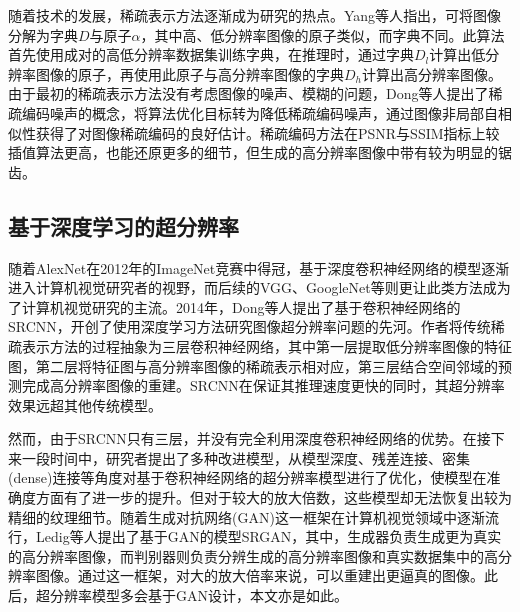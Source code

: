 随着技术的发展，稀疏表示方法逐渐成为研究的热点。Yang等人\parencite{4587647}指出，可将图像分解为字典$D$与原子$\alpha$，其中高、低分辨率图像的原子类似，而字典不同。此算法首先使用成对的高低分辨率数据集训练字典，在推理时，通过字典$D_l$计算出低分辨率图像的原子，再使用此原子与高分辨率图像的字典$D_h$计算出高分辨率图像。由于最初的稀疏表示方法没有考虑图像的噪声、模糊的问题，Dong等人\parencite{6392274}提出了稀疏编码噪声的概念，将算法优化目标转为降低稀疏编码噪声，通过图像非局部自相似性获得了对图像稀疏编码的良好估计。稀疏编码方法在PSNR与SSIM指标上较插值算法更高，也能还原更多的细节，但生成的高分辨率图像中带有较为明显的锯齿。

\subsection{基于深度学习的超分辨率}
随着AlexNet\parencite{NIPS2012_c399862d}在2012年的ImageNet竞赛中得冠，基于深度卷积神经网络的模型逐渐进入计算机视觉研究者的视野，而后续的VGG\parencite{simonyan2014very}、GoogleNet\parencite{szegedy2015going}等则更让此类方法成为了计算机视觉研究的主流。2014年，Dong等人\parencite{SRCNN}提出了基于卷积神经网络的SRCNN，开创了使用深度学习方法研究图像超分辨率问题的先河。作者将传统稀疏表示方法的过程抽象为三层卷积神经网络，其中第一层提取低分辨率图像的特征图，第二层将特征图与高分辨率图像的稀疏表示相对应，第三层结合空间邻域的预测完成高分辨率图像的重建。SRCNN在保证其推理速度更快的同时，其超分辨率效果远超其他传统模型。

然而，由于SRCNN只有三层，并没有完全利用深度卷积神经网络的优势。在接下来一段时间中，研究者提出了多种改进模型，从模型深度、残差连接、密集(dense)连接等角度对基于卷积神经网络的超分辨率模型进行了优化，使模型在准确度方面有了进一步的提升。但对于较大的放大倍数，这些模型却无法恢复出较为精细的纹理细节。随着生成对抗网络(GAN)这一框架在计算机视觉领域中逐渐流行，Ledig等人提出了基于GAN的模型SRGAN，其中，生成器负责生成更为真实的高分辨率图像，而判别器则负责分辨生成的高分辨率图像和真实数据集中的高分辨率图像。通过这一框架，对大的放大倍率来说，可以重建出更逼真的图像。此后，超分辨率模型多会基于GAN设计，本文亦是如此。

